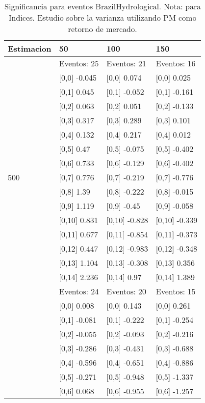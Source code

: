 \begin{table}

\caption{Significancia para eventos BrazilHydrological. Nota: para Indices. Estudio sobre la varianza utilizando PM como retorno de mercado.}
\centering
\begin{tabular}[t]{llll}
\toprule
Estimacion & 50 & 100 & 150\\
\midrule
 & Eventos:  25 & Eventos:  21 & Eventos:  16\\
 & {}[0,0] -0.045 & {}[0,0] 0.074 & {}[0,0] 0.025\\
 & {}[0,1] 0.045 & {}[0,1] -0.052 & {}[0,1] -0.161\\
 & {}[0,2] 0.063 & {}[0,2] 0.051 & {}[0,2] -0.133\\
 & {}[0,3] 0.317 & {}[0,3] 0.289 & {}[0,3] 0.101\\
\addlinespace
 & {}[0,4] 0.132 & {}[0,4] 0.217 & {}[0,4] 0.012\\
 & {}[0,5] 0.47 & {}[0,5] -0.075 & {}[0,5] -0.402\\
 & {}[0,6] 0.733 & {}[0,6] -0.129 & {}[0,6] -0.402\\
500 & {}[0,7] 0.776 & {}[0,7] -0.219 & {}[0,7] -0.776\\
 & {}[0,8] 1.39 & {}[0,8] -0.222 & {}[0,8] -0.015\\
\addlinespace
 & {}[0,9] 1.119 & {}[0,9] -0.45 & {}[0,9] -0.058\\
 & {}[0,10] 0.831 & {}[0,10] -0.828 & {}[0,10] -0.339\\
 & {}[0,11] 0.677 & {}[0,11] -0.854 & {}[0,11] -0.373\\
 & {}[0,12] 0.447 & {}[0,12] -0.983 & {}[0,12] -0.348\\
 & {}[0,13] 1.104 & {}[0,13] -0.308 & {}[0,13] 0.356\\
\addlinespace
 & {}[0,14] 2.236 & {}[0,14] 0.97 & {}[0,14] 1.389\\
 & Eventos:  24 & Eventos:  20 & Eventos:  15\\
 & {}[0,0] 0.008 & {}[0,0] 0.143 & {}[0,0] 0.261\\
 & {}[0,1] -0.081 & {}[0,1] -0.222 & {}[0,1] -0.254\\
 & {}[0,2] -0.055 & {}[0,2] -0.093 & {}[0,2] -0.216\\
\addlinespace
 & {}[0,3] -0.286 & {}[0,3] -0.431 & {}[0,3] -0.688\\
 & {}[0,4] -0.596 & {}[0,4] -0.651 & {}[0,4] -0.886\\
 & {}[0,5] -0.271 & {}[0,5] -0.948 & {}[0,5] -1.337\\
 & {}[0,6] 0.068 & {}[0,6] -0.955 & {}[0,6] -1.257\\

\end{tabular}
\end{table}
